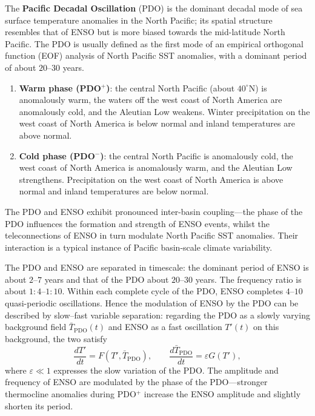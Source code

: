 \begin{definition}\label{def:pdo}
The \textbf{Pacific Decadal Oscillation} (PDO) is the dominant decadal mode of sea surface temperature anomalies in the North Pacific; its spatial structure resembles that of ENSO but is more biased towards the mid-latitude North Pacific. The PDO is usually defined as the first mode of an empirical orthogonal function (EOF) analysis of North Pacific SST anomalies, with a dominant period of about $20$--$30$ years.
\begin{enumerate}[label=(\roman*)]
    \item \textbf{Warm phase (PDO$^+$)}: the central North Pacific (about $40^\circ$N) is anomalously warm, the waters off the west coast of North America are anomalously cold, and the Aleutian Low weakens. Winter precipitation on the west coast of North America is below normal and inland temperatures are above normal.
    \item \textbf{Cold phase (PDO$^-$)}: the central North Pacific is anomalously cold, the west coast of North America is anomalously warm, and the Aleutian Low strengthens. Precipitation on the west coast of North America is above normal and inland temperatures are below normal.
\end{enumerate}
The PDO and ENSO exhibit pronounced inter-basin coupling---the phase of the PDO influences the formation and strength of ENSO events, whilst the teleconnections of ENSO in turn modulate North Pacific SST anomalies. Their interaction is a typical instance of Pacific basin-scale climate variability.
\end{definition}

\begin{proposition}\label{prop:pdo_enso_separation}
The PDO and ENSO are separated in timescale: the dominant period of ENSO is about $2$--$7$ years and that of the PDO about $20$--$30$ years. The frequency ratio is about $1:4$--$1:10$. Within each complete cycle of the PDO, ENSO completes $4$--$10$ quasi-periodic oscillations. Hence the modulation of ENSO by the PDO can be described by slow--fast variable separation: regarding the PDO as a slowly varying background field $\bar{T}_{\text{PDO}}(t)$ and ENSO as a fast oscillation $T'(t)$ on this background, the two satisfy
\[
\frac{dT'}{dt} = F(T', \bar{T}_{\text{PDO}}), \qquad \frac{d\bar{T}_{\text{PDO}}}{dt} = \varepsilon G(T'),
\]
where $\varepsilon \ll 1$ expresses the slow variation of the PDO. The amplitude and frequency of ENSO are modulated by the phase of the PDO---stronger thermocline anomalies during PDO$^+$ increase the ENSO amplitude and slightly shorten its period.
\end{proposition}

